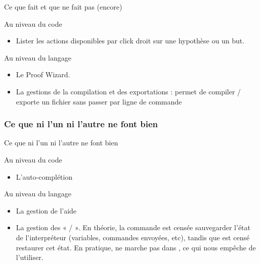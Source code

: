         \begin{frame}{Ce que \coqide fait et que \coquille ne fait pas (encore)}
            \begin{block}{Au niveau du code}
                \begin{itemize}
                    \item Lister les actions disponibles par click droit sur une hypothèse ou un but.
                \end{itemize}
            \end{block}
            \begin{block}{Au niveau du langage}
                \begin{itemize}
                    \item Le Proof Wizard.
                    \item La gestions de la compilation et des exportations : \coqide permet de compiler / exporte un fichier sans passer par ligne de commande
                \end{itemize}
            \end{block}
        \end{frame}

    \subsubsection{Ce que ni l'un ni l'autre ne font bien}

        \begin{frame}{Ce que ni l'un ni l'autre ne font bien}
            \begin{block}{Au niveau du code}
                \begin{itemize}
                    \item L'auto-complétion
                \end{itemize}
            \end{block}
            \begin{block}{Au niveau du langage}
                \begin{itemize}
                    \item La gestion de l'aide
                    \item La gestion des «  /  ».
                    En théorie, la commande  est censée sauvegarder l'état de l'interpréteur (variables, commandes envoyées, etc), tandis que  est censé restaurer cet état.
			        En pratique,  ne marche pas dans \coqtop, ce qui nous empêche de l'utiliser.
                \end{itemize}
            \end{block}
        \end{frame}

